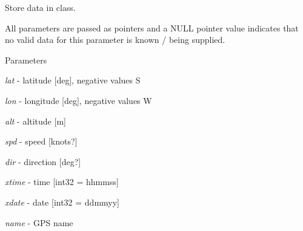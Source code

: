 Store data in class. 

All parameters are passed as pointers and a NULL pointer value indicates that no valid data for this parameter is known / being supplied. 
\begin{DoxyParams}{Parameters}
\item[{\em lat}]-\/ latitude \mbox{[}deg\mbox{]}, negative values S \item[{\em lon}]-\/ longitude \mbox{[}deg\mbox{]}, negative values W \item[{\em alt}]-\/ altitude \mbox{[}m\mbox{]} \item[{\em spd}]-\/ speed \mbox{[}knots?\mbox{]} \item[{\em dir}]-\/ direction \mbox{[}deg?\mbox{]} \item[{\em xtime}]-\/ time \mbox{[}int32 = hhmmss\mbox{]} \item[{\em xdate}]-\/ date \mbox{[}int32 = ddmmyy\mbox{]} \item[{\em name}]-\/ GPS name \end{DoxyParams}


